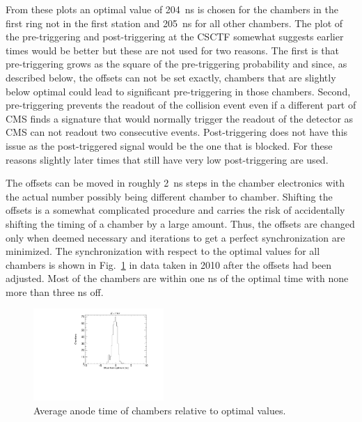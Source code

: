 From these plots an optimal value of 204~ns is chosen for the chambers in the first ring not in the first station and 205~ns for all other chambers.
The plot of the pre-triggering and post-triggering at the CSCTF somewhat suggests earlier times would be better but these are not used for two reasons.
The first is that pre-triggering grows as the square of the pre-triggering probability and since, as described below, the offsets can not be set exactly, chambers
that are slightly below optimal could lead to significant pre-triggering in those chambers. Second, pre-triggering prevents the readout
of the collision event even if a different part of CMS finds a signature that would normally trigger the readout of the detector as
CMS can not readout two consecutive events. Post-triggering does not have this issue as the post-triggered signal would be the one that is blocked.
For these reasons slightly later times that still have very low post-triggering are used.

The offsets can be moved in roughly 2~ns steps in the chamber electronics with the actual number possibly being different chamber to chamber. Shifting the offsets is a
somewhat complicated procedure and carries the risk of accidentally shifting the timing of a chamber by a large amount. Thus, the offsets are changed only
when deemed necessary and iterations to get a perfect synchronization are minimized. The synchronization with respect to the optimal values for all chambers
is shown in Fig.~\ref{fig:average_anodes} in data taken in 2010 after the offsets had been adjusted.
Most of the chambers are within one ns of the optimal time with none more than three ns off.

\begin{figure}
  \begin{center}
      \includegraphics[clip=true, trim=0.0cm 0cm 0.0cm 0cm, width=0.44\textwidth]{figures/timing/average_anodes}
      \caption[Average anode time of chambers relative to optimal values.]
      {Average anode time of chambers relative to optimal values.
        }
      \label{fig:average_anodes}
  \end{center}
\end{figure}

